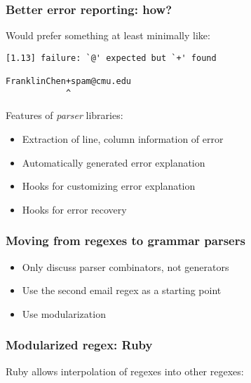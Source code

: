 \begin{frame}[fragile]
  \frametitle{Better error reporting: how?}

  Would prefer something at least minimally like:

  \begin{verbatim}
[1.13] failure: `@' expected but `+' found

FranklinChen+spam@cmu.edu
            ^
  \end{verbatim}

  Features of \emph{parser} libraries:
  \begin{itemize}
    \item Extraction of line, column information of error
    \item Automatically generated error explanation
    \item Hooks for customizing error explanation
    \item Hooks for error recovery
  \end{itemize}
\end{frame}

\begin{frame}
  \frametitle{Moving from regexes to grammar parsers}

  \begin{itemize}
    \item Only discuss parser combinators, not generators
    \item Use the second email regex as a starting point
    \item Use modularization
  \end{itemize}
\end{frame}

%


%
%


\begin{frame}[fragile]
  \frametitle{Modularized regex: Ruby}

  Ruby allows interpolation of regexes into other regexes:

  \inputminted{ruby}{ruby/lib/email_validator/pretty_regex_matcher.rb}
\end{frame}


